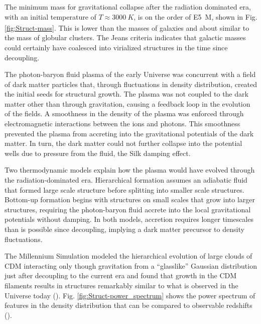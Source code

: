 \documentclass{paper}
\begin{document}
  The minimum mass for gravitational collapse after the radiation dominated
  era, with an initial temperature of \(T \approx \SI{3000}{K}\), is on the 
  order of \SI{E5}{M_{\astrosun}}, shown in Fig. \ref{fig:Struct-mass}.  This 
  is lower than the masses of galaxies and about similar to the mass of 
  globular clusters.  The Jeans criteria indicates that galactic masses could 
  certainly have coalesced into virialized structures in the time since 
  decoupling.

  The photon-baryon fluid plasma of the early Universe was concurrent with a 
  field of dark matter particles that, through fluctuations in density 
  distribution, created the initial seeds for structural growth. The plasma 
  was not coupled to the dark matter other than through gravitation, causing
  a feedback loop in the evolution of the fields. A smoothness in the density
  of the plasma was enforced through electromagnetic interactions between the 
  ions and photons.  This smoothness prevented the plasma from accreting into 
  the gravitational potentials of the dark matter. In turn, the dark matter 
  could not further collapse into the potential wells due to pressure from the 
  fluid, the Silk damping effect.  

  Two thermodynamic models explain how the plasma would have evolved through 
  the radiation-dominated era. Hierarchical formation assumes an adiabatic 
  fluid that formed large scale structure before splitting into smaller scale 
  structures. Bottom-up formation begins with structures on small scales that 
  grow into larger structures, requiring the photon-baryon fluid accrete into 
  the local gravitational potentials without damping. In both models, 
  accretion requires longer timescales than is possible since decoupling, 
  implying a dark matter precursor to density fluctuations.

  The Millennium Simulation modeled the hierarchical evolution of large clouds 
  of CDM interacting only though gravitation from a ``glasslike'' Gaussian 
  distribution just after decoupling to the current era and found that growth 
  in the CDM filaments results in structures remarkably similar to what is 
  observed in the Universe today (\cite{desjacques2018large}). Fig. 
  \ref{fig:Struct-power_spectrum} shows the power spectrum of features in the 
  density distribution that can be compared to observable redshifts
  (\cite{2005Natur.435..629S}). 
\end{document}
